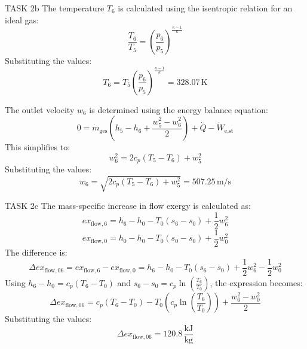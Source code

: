 TASK 2b  
The temperature \( T_6 \) is calculated using the isentropic relation for an ideal gas:  
\[
\frac{T_6}{T_5} = \left( \frac{p_6}{p_5} \right)^{\frac{\kappa - 1}{\kappa}}
\]  
Substituting the values:  
\[
T_6 = T_5 \left( \frac{p_6}{p_5} \right)^{\frac{\kappa - 1}{\kappa}} = 328.07 \, \text{K}
\]  

The outlet velocity \( w_6 \) is determined using the energy balance equation:  
\[
0 = \dot{m}_{\text{ges}} \left( h_5 - h_6 + \frac{w_5^2 - w_6^2}{2} \right) + \dot{Q} - \dot{W}_{\text{e,st}}
\]  
This simplifies to:  
\[
w_6^2 = 2 c_p (T_5 - T_6) + w_5^2
\]  
Substituting the values:  
\[
w_6 = \sqrt{2 c_p (T_5 - T_6) + w_5^2} = 507.25 \, \text{m/s}
\]  

TASK 2c  
The mass-specific increase in flow exergy is calculated as:  
\[
ex_{\text{flow},6} = h_6 - h_0 - T_0 (s_6 - s_0) + \frac{1}{2} w_6^2
\]  
\[
ex_{\text{flow},0} = h_0 - h_0 - T_0 (s_0 - s_0) + \frac{1}{2} w_0^2
\]  
The difference is:  
\[
\Delta ex_{\text{flow},06} = ex_{\text{flow},6} - ex_{\text{flow},0} = h_6 - h_0 - T_0 (s_6 - s_0) + \frac{1}{2} w_6^2 - \frac{1}{2} w_0^2
\]  
Using \( h_6 - h_0 = c_p (T_6 - T_0) \) and \( s_6 - s_0 = c_p \ln \left( \frac{T_6}{T_0} \right) \), the expression becomes:  
\[
\Delta ex_{\text{flow},06} = c_p (T_6 - T_0) - T_0 \left( c_p \ln \left( \frac{T_6}{T_0} \right) \right) + \frac{w_6^2 - w_0^2}{2}
\]  
Substituting the values:  
\[
\Delta ex_{\text{flow},06} = 120.8 \, \frac{\text{kJ}}{\text{kg}}
\]
